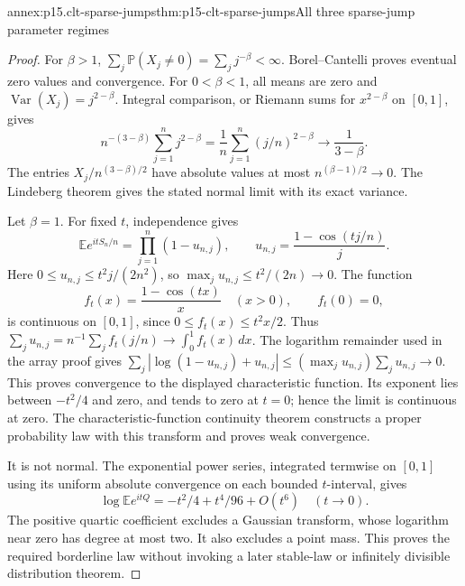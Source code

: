 \begin{annexitem}{annex:p15.clt-sparse-jumps}{thm:p15-clt-sparse-jumps}{All three sparse-jump parameter regimes}
\begin{proof}
For \(\beta>1\),
\(\sum_j\mathbb P(X_j\ne0)=\sum_jj^{-\beta}<\infty\).
Borel--Cantelli proves eventual zero values and convergence.
For \(0<\beta<1\), all means are zero and
\(\operatorname{Var}(X_j)=j^{2-\beta}\). Integral comparison,
or Riemann sums for \(x^{2-\beta}\) on \([0,1]\), gives
\[
 n^{-(3-\beta)}\sum_{j=1}^nj^{2-\beta}
       =\frac1n\sum_{j=1}^n(j/n)^{2-\beta}
       \longrightarrow\frac1{3-\beta}.
 \]
The entries \(X_j/n^{(3-\beta)/2}\) have absolute values at
most \(n^{(\beta-1)/2}\to0\). The Lindeberg theorem gives
the stated normal limit with its exact variance.

Let \(\beta=1\). For fixed \(t\), independence gives
\[
 \mathbb Ee^{itS_n/n}
 =\prod_{j=1}^n(1-u_{n,j}),\qquad
 u_{n,j}=\frac{1-\cos(tj/n)}j.
 \]
Here \(0\leq u_{n,j}\leq t^2j/(2n^2)\), so
\(\max_ju_{n,j}\leq t^2/(2n)\to0\).
The function
\[
 f_t(x)=\frac{1-\cos(tx)}x\quad(x>0),\qquad f_t(0)=0,
 \]
is continuous on \([0,1]\), since
\(0\leq f_t(x)\leq t^2x/2\).
Thus
\(\sum_ju_{n,j}=n^{-1}\sum_j f_t(j/n)\to\int_0^1 f_t(x)\,dx\).
The logarithm remainder used in the array proof gives
\(\sum_j|\log(1-u_{n,j})+u_{n,j}|
\leq(\max_ju_{n,j})\sum_ju_{n,j}\to0\).
This proves convergence to the displayed characteristic function.
Its exponent lies between \(-t^2/4\) and zero, and tends to
zero at \(t=0\); hence the limit is continuous at zero.
The characteristic-function continuity theorem constructs a
proper probability law with this transform and proves weak convergence.

It is not normal. The exponential power series, integrated
termwise on \([0,1]\) using its uniform absolute convergence
on each bounded \(t\)-interval, gives
\[
 \log\mathbb Ee^{itQ}
       =-t^2/4+t^4/96+O(t^6)\quad(t\to0).
 \]
The positive quartic coefficient excludes a Gaussian transform,
whose logarithm near zero has degree at most two. It also
excludes a point mass. This proves the required borderline
law without invoking a later stable-law or infinitely divisible
distribution theorem.
\end{proof}
\end{annexitem}
